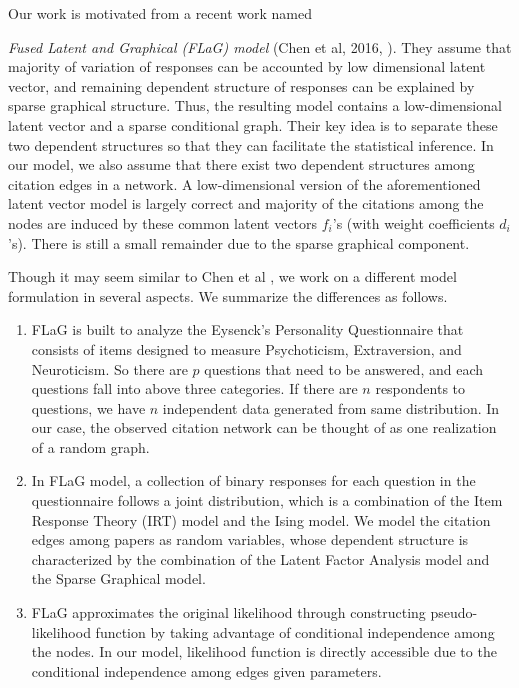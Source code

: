 \documentclass[AMS,STIX1COL]{WileyNJD-v2}
\begin{document}
Our work is motivated from a recent work named {\emph{Fused Latent and Graphical (FLaG) model} (Chen et al, 2016, \cite{chen2016fused}).
They assume that majority of variation of responses can be accounted by low dimensional latent vector, and remaining dependent structure of responses can be explained by sparse graphical structure.
Thus, the resulting model contains a low-dimensional latent vector and a sparse conditional graph.
Their key idea is to separate these two dependent structures so that they can facilitate the statistical inference.
In our model, we also assume that there exist two dependent structures among citation edges in a network.
A low-dimensional version of the aforementioned latent vector model is largely correct and majority of the citations among the nodes are induced by these common latent vectors $f_{i}$'s (with weight coefficients $d_{i}$'s).
There is still a small remainder due to the sparse graphical component.

Though it may seem similar to Chen et al \cite{chen2016fused}, we work on a different model formulation in several aspects.
We summarize the differences as follows.
\begin{enumerate}
\item FLaG is built to analyze the Eysenck's Personality Questionnaire that consists of items designed to measure Psychoticism, Extraversion, and Neuroticism.
    So there are $p$ questions that need to be answered, and each questions fall into above three categories.
    If there are $n$ respondents to questions, we have $n$ independent data generated from same distribution.
    In our case, the observed citation network can be thought of as one realization of a random graph.

\item In FLaG model, a collection of binary responses for each question in the questionnaire follows a joint distribution, which is a combination of the Item Response Theory (IRT) model and the Ising model.
    We model the citation edges among papers as random variables, whose dependent structure is characterized by the combination of the Latent Factor Analysis model and the Sparse Graphical model.

\item FLaG approximates the original likelihood through constructing pseudo-likelihood function by taking advantage of conditional independence among the nodes.
    In our model, likelihood function is directly accessible due to the conditional independence among edges given parameters.
\end{enumerate}

}
\end{document}
